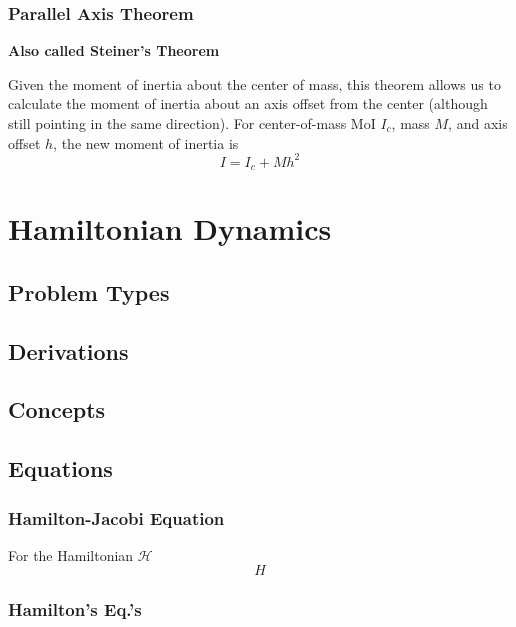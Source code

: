 \documentclass[25pt]{book}
\begin{document}
	\subsection{Parallel Axis Theorem}
	\textbf{Also called Steiner's Theorem}
	
	Given the moment of inertia about the center of mass, this theorem allows us to calculate the moment of inertia about an axis offset from the center (although still pointing in the same direction). For center-of-mass MoI $I_c$, mass $M$, and axis offset $h$, the new moment of inertia is
	\[
	I = I_c + Mh^2
	\]
	
	\chapter{Hamiltonian Dynamics}
	
	\section{Problem Types}
	
	\section{Derivations}
	
	\section{Concepts}
	
	\section{Equations}
	
	\subsection{Hamilton-Jacobi Equation}
	
	For the Hamiltonian $\mathcal{H}$
	\[
	H
	\]
	
	\subsection{Hamilton's Eq.'s}
	
	
\end{document}
